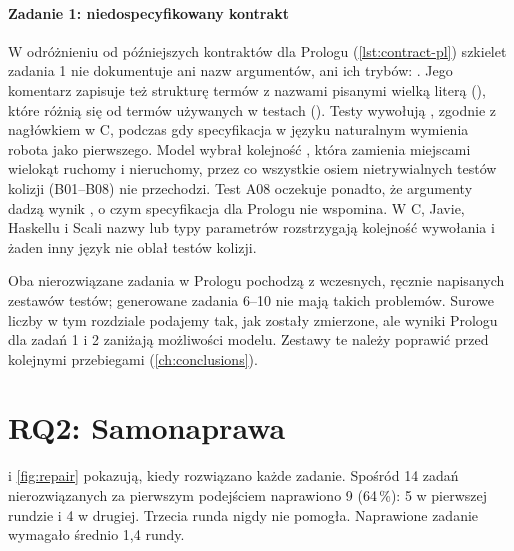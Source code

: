 \paragraph{Zadanie 1: niedospecyfikowany kontrakt} W odróżnieniu od późniejszych kontraktów dla
Prologu (\cref{lst:contract-pl}) szkielet zadania 1 nie dokumentuje ani nazw argumentów, ani ich
trybów: . Jego komentarz zapisuje też strukturę termów
z nazwami pisanymi wielką literą (), które różnią się od termów używanych
w testach (). Testy wywołują , zgodnie z nagłówkiem w C, podczas gdy specyfikacja w języku naturalnym wymienia robota
jako pierwszego. Model wybrał kolejność , która zamienia miejscami
wielokąt ruchomy i nieruchomy, przez co wszystkie osiem nietrywialnych testów kolizji (B01--B08) nie
przechodzi. Test A08 oczekuje ponadto, że argumenty  dadzą wynik , o czym
specyfikacja dla Prologu nie wspomina. W C, Javie, Haskellu i Scali nazwy lub typy parametrów
rozstrzygają kolejność wywołania i żaden inny język nie oblał testów kolizji.

\begin{findingbox}[Spostrzeżenie.]
Oba nierozwiązane zadania w Prologu pochodzą z wczesnych, ręcznie napisanych zestawów testów;
generowane zadania 6--10 nie mają takich problemów. Surowe liczby w tym rozdziale podajemy tak, jak
zostały zmierzone, ale wyniki Prologu dla zadań 1 i 2 zaniżają możliwości modelu. Zestawy te należy
poprawić przed kolejnymi przebiegami (\cref{ch:conclusions}).
\end{findingbox}

\section{RQ2: Samonaprawa}
\label{sec:results-repair}

 i \cref{fig:repair} pokazują, kiedy rozwiązano każde zadanie. Spośród 14 zadań
nierozwiązanych za pierwszym podejściem naprawiono 9 (64\,\%): 5 w pierwszej rundzie i 4 w drugiej.
Trzecia runda nigdy nie pomogła. Naprawione zadanie wymagało średnio 1,4 rundy.

